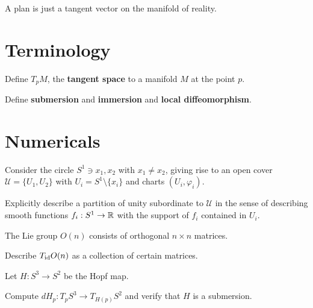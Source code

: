 \documentclass{homework}
\author{Jim Fowler}
\begin{document}
\maketitle

\begin{inspiration}
  A plan is just a tangent vector on the manifold of reality.
\end{inspiration}

\section{Terminology}

\begin{problem}
  Define $T_p M$, the \textbf{tangent space} to a manifold $M$ at the
  point $p$.
\end{problem}

\begin{problem}
  Define \textbf{submersion} and \textbf{immersion} and \textbf{local diffeomorphism}.
\end{problem}

\section{Numericals}

\begin{problem}
  Consider the circle $S^1 \ni x_1, x_2$ with $x_1 \neq x_2$, giving
  rise to an open cover $\mathcal{U} = \{ U_1, U_2 \}$ with
  $U_i = S^1 \setminus \{x_i\}$ and charts $(U_i,\varphi_i)$.

  Explicitly describe a partition of unity subordinate to
  $\mathcal{U}$ in the sense of describing smooth functions
  $f_i : S^1 \to \mathbb{R}$ with the support of $f_i$ contained in $U_i$.
\end{problem}

\begin{problem}
  The Lie group $O(n)$ consists of orthogonal $n \times n$ matrices.

  Describe $T_{\operatorname{id}} O(n)$ as a collection of certain matrices.
\end{problem}

\begin{problem}
  Let $H : S^3 \to S^2$ be the Hopf map.

  Compute $dH_p : T_p S^3 \to T_{H(p)} S^2$ and verify that $H$ is a
  submersion.
\end{problem}
\end{document}

